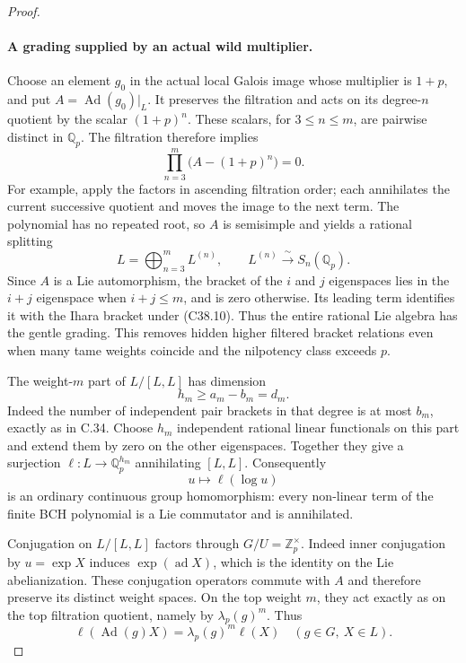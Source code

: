 \begin{proof}
\paragraph{A grading supplied by an actual wild multiplier.}
Choose an element \(g_0\) in the actual local Galois image
whose multiplier is \(1+p\), and put
\(A=\operatorname{Ad}(g_0)|_L\).
It preserves the filtration and acts on its degree-\(n\)
quotient by the scalar \((1+p)^n\).
These scalars, for \(3\leq n\leq m\), are pairwise
distinct in \(\mathbb Q_p\).
The filtration therefore implies
\[
           \prod_{n=3}^{m}\bigl(A-(1+p)^n\bigr)=0.
                                                               \tag{C38.9}
\]
For example, apply the factors in ascending filtration
order; each annihilates the current successive quotient
and moves the image to the next term.
The polynomial has no repeated root, so \(A\) is
semisimple and yields a rational splitting
\[
      L=\bigoplus_{n=3}^{m}L^{(n)},\qquad
      L^{(n)}\xrightarrow{\ \sim\ }S_n(\mathbb Q_p).
                                                               \tag{C38.10}
\]
Since \(A\) is a Lie automorphism, the bracket of the
\(i\) and \(j\) eigenspaces lies in the \(i+j\)
eigenspace when \(i+j\leq m\), and is zero otherwise.
Its leading term identifies it with the Ihara bracket
under (C38.10).
Thus the entire rational Lie algebra has the gentle
grading.  This removes hidden higher filtered bracket
relations even when many tame weights coincide and the
nilpotency class exceeds \(p\).

The weight-\(m\) part of \(L/[L,L]\) has dimension
\[
        h_m\geq a_m-b_m=d_m.
                                                               \tag{C38.11}
\]
Indeed the number of independent pair brackets in that
degree is at most \(b_m\), exactly as in C.34.
Choose \(h_m\) independent rational linear functionals
on this part and extend them by zero on the other
eigenspaces.  Together they give a surjection
\(\ell:L\to\mathbb Q_p^{h_m}\) annihilating \([L,L]\).
Consequently
\[
                      u\longmapsto\ell(\log u)
                                                               \tag{C38.12}
\]
is an ordinary continuous group homomorphism:
every non-linear term of the finite BCH polynomial
is a Lie commutator and is annihilated.

Conjugation on \(L/[L,L]\) factors through
\(G/U=\mathbb Z_p^\times\).
Indeed inner conjugation by \(u=\exp X\) induces
\(\exp(\operatorname{ad}X)\), which is the identity
on the Lie abelianization.
These conjugation operators commute with \(A\) and
therefore preserve its distinct weight spaces.
On the top weight \(m\), they act exactly as on
the top filtration quotient, namely by
\(\lambda_p(g)^m\).
Thus
\[
       \ell(\operatorname{Ad}(g)X)
                    =\lambda_p(g)^m\ell(X)
             \quad(g\in G,\ X\in L).
                                                               \tag{C38.13}
\]


\end{proof}
